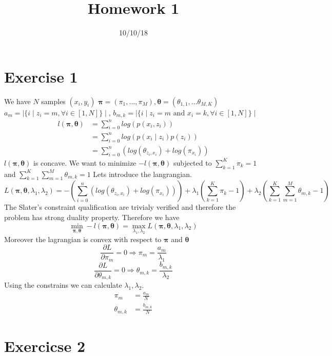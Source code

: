 \documentclass[]{article}
\title{Homework 1}
\date{10/10/18}
\begin{document}
\section{Exercise 1}
We have $N$ samples $(x_i,y_i)$
$\pmb{\pi} = (\pi_1, ..., \pi_M), \pmb{\theta} = (\theta_{1,1}, ... \theta_{M,K})$	\\
$a_m = \mid \{ i \mid  z_i = m, \forall i \in [1,N]\}\mid $, $b_{m,k} = \mid \{ i \mid  z_i = m \text{ and } x_i = k, \forall i \in [1,N]\}\mid $
\begin{align*}
l(\pmb{\pi}, \pmb{\theta}) &= \sum_{i=0}^n log(p(x_i,z_i)) \\
&= \sum_{i=0}^n log(p(x_i \mid  z_i)p(z_i))\\
&= \sum_{i=0}^n (log(\theta_{z_i,x_i}) + log(\pi_{x_i}))
\end{align*}
$l(\pmb{\pi}, \pmb{\theta})$ is concave. We want to minimize $- l(\pmb{\pi}, \pmb{\theta})$ subjected to $\sum_{k=1}^K \pi_k = 1$ and $\sum_{k=1}^K \sum_{m=1}^M \theta_{m,k} = 1$
Lets introduce the langrangian.
$$ L(\pmb{\pi}, \pmb{\theta}, \lambda_1, \lambda_2) = - (\sum_{i=0}^n (log(\theta_{z_i,x_i}) + log(\pi_{x_i}))) + \lambda_1(\sum_{k=1}^K \pi_k - 1) + \lambda_2(\sum_{k=1}^K \sum_{m=1}^M \theta_{m,k} - 1) $$
The Slater’s constraint qualification are trivialy verified and therefore the problem has strong duality property. Therefore we have
$$ \min_{\pmb{\pi}, \pmb{\theta}} - l(\pmb{\pi}, \pmb{\theta}) = \max_{\lambda_1, \lambda_2}  L(\pmb{\pi}, \pmb{\theta}, \lambda_1, \lambda_2) $$
Moreover the lagrangian is convex with respect to $\pmb{\pi}$ and $\pmb{\theta}$
$$ \frac{\partial L}{\partial \pi_m} = 0 \Rightarrow \pi_m = \frac{a_m}{\lambda_1}$$
$$ \frac{\partial L}{\partial \theta_{m,k}} = 0 \Rightarrow \theta_{m,k} = \frac{b_{m,k}}{\lambda_2}$$
Using the constrains we can calculate $\lambda_1, \lambda_2$.
\begin{align*}
\pi_m &= \frac{a_m}{N} \\
\theta_{m,k} &= \frac{b_{m,k}}{N}
\end{align*}

\section{Exercicse 2}
\end{document}
